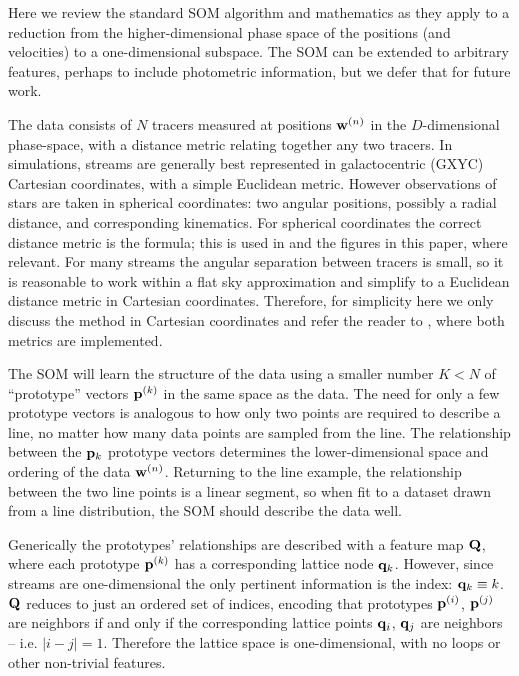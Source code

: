 \documentclass[fleqn,usenatbib]{mnras}
\begin{document}
      Here we review the standard SOM algorithm and mathematics as they apply to
      a reduction from the higher-dimensional phase space of the positions (and
      velocities) to a one-dimensional subspace. The SOM can be extended to
      arbitrary features, perhaps to include photometric information, but we
      defer that for future work.

      The data consists of $N$ tracers measured at positions $\mathbf{w}^{(n)}$ in
      the $D$-dimensional phase-space, with a distance metric relating together
      any two tracers. In simulations, streams are generally best represented in
      galactocentric (GXYC) Cartesian coordinates, with a simple Euclidean
      metric. However observations of stars are taken in spherical coordinates:
      two angular positions, possibly a radial distance, and corresponding
      kinematics. For spherical coordinates the correct distance metric is the
      \citet{Vincenty1975} formula; this is used in \trackstream{} and the
      figures in this paper, where relevant. For many streams the angular
      separation between tracers is small, so it is reasonable to work within a
      flat sky approximation and simplify to a Euclidean distance metric in
      Cartesian coordinates. Therefore, for simplicity here we only discuss the
      method in Cartesian coordinates and refer the reader to \trackstream{},
      where both metrics are implemented.

      The SOM will learn the structure of the data using a smaller number $K <
      N$ of ``prototype'' vectors $\mathbf{p}^{(k)}$ in the same space as the data.
      The need for only a few prototype vectors is analogous to how only two
      points are required to describe a line, no matter how many data points are
      sampled from the line. The relationship between the $\mathbf{p}_{k}$
      prototype vectors determines the lower-dimensional space and ordering of
      the data $\mathbf{w}^{(n)}$. Returning to the line example, the relationship
      between the two line points is a linear segment, so when fit to a dataset
      drawn from a line distribution, the SOM should describe the data well.

      Generically the prototypes' relationships are described with a feature map
      $\mathbf{Q}$, where each prototype $\mathbf{p}^{(k)}$ has a corresponding
      lattice node $\mathbf{q}_k$. However, since streams are one-dimensional the
      only pertinent information is the index: $\mathbf{q}_k \equiv k$. $\mathbf{Q}$
      reduces to just an ordered set of indices, encoding that prototypes
      $\mathbf{p}^{(i)}$, $\mathbf{p}^{(j)}$ are neighbors if and only if the
      corresponding lattice points $\mathbf{q}_i$, $\mathbf{q}_j$ are neighbors --
      i.e. $|i-j| = 1$. Therefore the lattice space is one-dimensional, with no
      loops or other non-trivial features.
\end{document}
